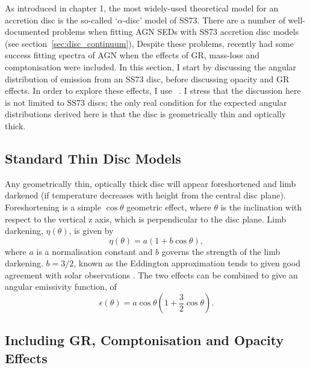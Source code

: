 \noindent 
As introduced in chapter 1, the most widely-used theoretical model for an accretion disc
is the so-called `$\alpha$-disc' model of SS73. 
There are a number of well-documented problems when fitting 
AGN SEDs with SS73 accretion disc models (see section~\ref{sec:disc_continuum}), 
Despite these problems, \cite{capellupo2015} recently had 
some success fitting spectra of AGN when the effects of
GR, mass-loss and comptonisation were included.
In this section, I start by discussing the angular distribution of
emission from an SS73 disc, before discussing opacity and GR 
effects. In order to explore these effects, I use \agn\
\citep{hubeny2000,davishubeny2006,davis2007}. I stress that the 
discussion here is not limited to SS73 discs; the only real condition
for the expected angular distributions derived here is that the 
disc is geometrically thin and optically thick.

\subsection{Standard Thin Disc Models}

\noindent
Any geometrically thin, optically thick disc will appear
foreshortened and limb darkened (if temperature decreases
with height from the central disc plane). 
Foreshortening is a simple $\cos \theta$ geometric effect, 
where $\theta$ is the inclination with respect to the vertical z axis, which
is perpendicular to the disc plane.
Limb darkening, $\eta(\theta)$, is given by
\begin{equation}
\eta(\theta) = a \left( 1 + b \cos \theta \right),
\end{equation}
where $a$ is a normalisation constant and $b$ governs the strength
of the limb darkening. $b=3/2$, known as the Eddington approximation
tends to given good agreement with solar observations 
\citep[e.g.][]{mihalas}. The two effects can be 
combined to give an angular emissivity function, of
\begin{equation}
\epsilon(\theta) = a \cos \theta \left( 1 + \frac{3}{2} \cos \theta \right).
\end{equation}

\subsection{Including GR, Comptonisation and Opacity Effects}

